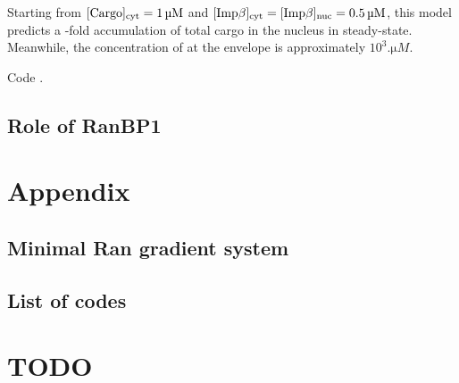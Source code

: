 \documentclass[12pt,notitlepage]{article}
\begin{document}
%

Starting from 
$[\ce{Cargo}]_\text{cyt} = \SI{1}{\micro M}$
and
$[\ce{Imp\beta}]_\text{cyt} = [\ce{Imp\beta}]_\text{nuc} = \SI{0.5}{\micro M}$,
this model
predicts a 
\protect\unskip%
-fold accumulation
of total cargo in the nucleus
in steady-state.
%
Meanwhile,
the concentration of 
at the envelope is approximately $10^3 \si{. \micro M}$.

Code .







\subsection{Role of RanBP1}

\cite{SeewaldETAL2003}














\clearpage
\renewcommand*{\bibfont}{\normalfont\small}
\printbibliography %



\clearpage


\section{Appendix}

\subsection{Minimal Ran gradient system} \label{ss:gsr-ran}



\subsection{List of codes}

\begin{center}
\SHOWCODES
\end{center}



\section{TODO}
\SHOWTODOS



\leavevmode\vfill{\tiny\color{lightgray}\hfill{\DTMnow}}
\end{document}
